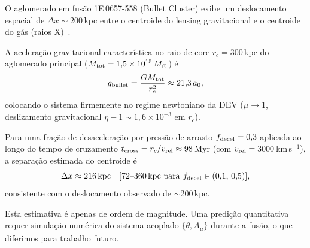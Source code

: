 \documentclass[aps,prd,twocolumn,showpacs,superscriptaddress]{revtex4-2}
\newcommand{\aO}{a_0}
\begin{document}
O aglomerado em fusão 1E\,0657-558 (Bullet Cluster) exibe um
deslocamento espacial de $\Delta x \sim 200$\,kpc entre o
centroide do lensing gravitacional e o centroide do gás
(raios X)~\cite{Clowe2006}.

A aceleração gravitacional característica no raio de core
$r_c = 300$\,kpc do aglomerado principal
($M_{\rm tot} = 1{,}5\times10^{15}\,M_\odot$) é
\begin{equation}
  g_{\rm bullet} = \frac{GM_{\rm tot}}{r_c^2}
  \approx 21{,}3\,\aO,
\end{equation}
colocando o sistema firmemente no regime newtoniano da DEV
($\mu \to 1$, deslizamento gravitacional
$\eta -1 \sim 1{,}6\times10^{-3}$ em $r_c$).

Para uma fração de desaceleração por pressão de arrasto
$f_{\rm decel} = 0{,}3$ aplicada ao longo do tempo de
cruzamento $t_{\rm cross} = r_c/v_{\rm rel} \approx 98$\,Myr
(com $v_{\rm rel} = 3000$\,km\,s$^{-1}$), a separação estimada
do centroide é
\begin{equation}
  \Delta x \approx 216\,{\rm kpc}
  \quad [72\text{--}360\,{\rm kpc\ para\ }
  f_{\rm decel}\in(0{,}1,\,0{,}5)],
\end{equation}
consistente com o deslocamento observado de ${\sim}200$\,kpc.

Esta estimativa é apenas de ordem de magnitude.
Uma predição quantitativa requer simulação numérica do sistema
acoplado $\{\theta, A_\mu\}$ durante a fusão, o que diferimos
para trabalho futuro.



\end{document}
